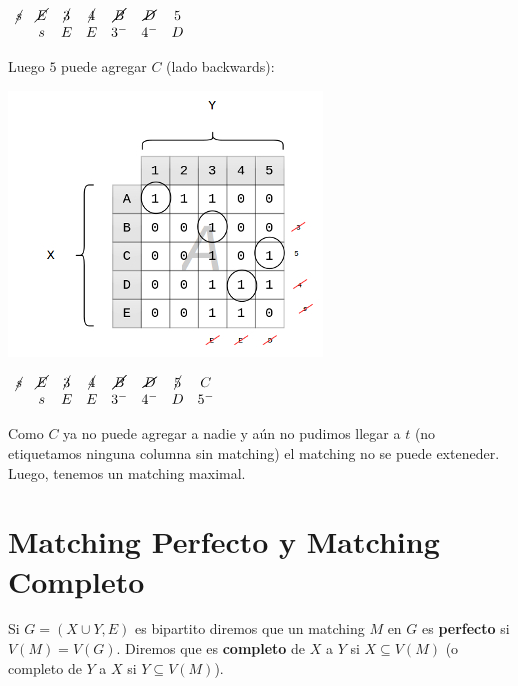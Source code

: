 \documentclass[10pt,a4paper]{article}
\begin{document}
\begin{center}
$\begin{array}{ccccccc} \cancel{s}& \cancel{E} & \cancel{3} & \cancel{4} & \cancel{B} & \cancel{D} & 5\\ & s & E & E & 3^- & 4^- & D \end{array}$
\end{center}

Luego $5$ puede agregar $C$ (lado backwards):

\begin{center}

    \begin{adjustbox}{max size={\textwidth}{\textheight}}
        \includegraphics{definitions/matching_12.jpg}
        \end{adjustbox}
    
\end{center}

\begin{center}
$\begin{array}{cccccccc} \cancel{s}& \cancel{E} & \cancel{3} & \cancel{4} & \cancel{B} & \cancel{D} & \cancel{5} & C\\ & s & E & E & 3^- & 4^- & D & 5^- \end{array}$
\end{center}

Como $C$ ya no puede agregar a nadie y aún no pudimos llegar a $t$ (no etiquetamos ninguna columna sin matching) el matching no se puede exteneder. Luego, tenemos un matching maximal.

\section*{Matching Perfecto y Matching Completo}

Si $G = (X \cup Y, E)$ es bipartito diremos que un matching $M$ en $G$ es \textbf{perfecto} si $V(M) = V(G)$. Diremos que es \textbf{completo} de $X$ a $Y$ si $X\subseteq V(M)$ (o completo de $Y$ a $X$ si $Y \subseteq V(M)$).
\end{document}
